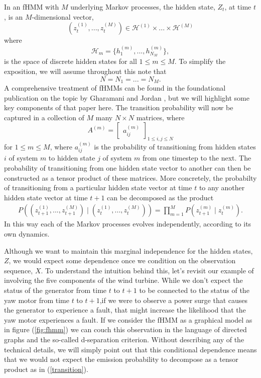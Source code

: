 \documentclass{article}
\begin{document}
In an fHMM with $M$ underlying Markov processes, the hidden state, $Z_t$, at time $t$, is an $M$-dimensional vector,
\[
(z_{t}^{(1)},...,z_{t}^{(M)}) \in \mathcal{H}^{(1)}\times ...\times \mathcal{H}^{(M)}
\]
where 
\[
\mathcal H_m = \{h_1^{(m)},...,h_{N_M}^{(m)}\}, 
\]
is the space of discrete hidden states for all $1\leq m\leq M$.  To simplify the exposition, we will assume throughout this note that 
\[
N = N_1 = ...= N_M.
\]
A comprehensive treatment of fHMMs can be found in the foundational publication on the topic by Gharamani and Jordan \cite{GJ95}, but we will highlight some key components of that paper here.  The transition probability will now be captured in a collection of $M$ many $N\times N$ matrices, where
\[
A^{(m)} = \begin{bmatrix}
a_{ij}^{(m)}
\end{bmatrix}_{1\leq i,j\leq N}
\]
for $1\leq m\leq M$, where $a_{ij}^{(m)}$ is the probability of transitioning from hidden states $i$ of system $m$ to hidden state $j$ of system $m$ from one timestep to the next.  The probability of transitioning from one hidden state vector to another can then be constructed as a tensor product of these matrices.  More concretely, the probabilty of transitioning from a particular hidden state vector at time $t$ to any another hidden state vector at time $t+1$ can be decomposed as the product
\begin{eqnarray}\label{transition}
P\left((z_{t+1}^{(1)},...,z_{t+1}^{(M)}) \mid (z_{t}^{(1)},...,z_{t}^{(M)})\right) = \prod_{m=1}^M P(z_{t+1}^{(m)} \mid z_{t}^{(m)}).
\end{eqnarray}
In this way each of the Markov processes evolves independently, according to its own dynamics. 

Although we want to maintain this marginal independence for the hidden states, $Z$, we would expect some dependence once we condition on the observation sequence, $X$.  To understand the intuition behind this, let's revisit our example of involving the five components of the wind turbine.  While we don't expect the status of the generator from time $t$ to $t+1$ to be connected to the status of the yaw motor from time $t$ to $t+1$,if we were to observe a power surge that causes the generator to experience a fault, that might increase the likelihood that the yaw motor experiences a fault.  If we consider the fHMM as a graphical model as in figure (\ref{fig:fhmm}) we can couch this observation in the language of directed graphs and the so-called d-separation criterion. Without describing any of the technical details, we will simply point out that this conditional dependence means that we would not expect the emission probability to decompose as a tensor product as in (\ref{transition}).
\end{document}
